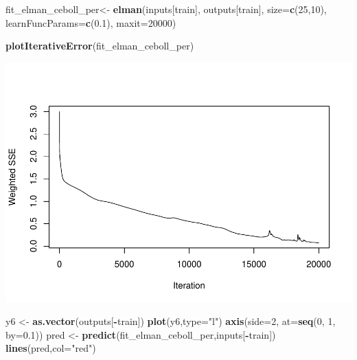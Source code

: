 \documentclass[
]{book}
\newenvironment{Shaded}{\begin{snugshade}}{\end{snugshade}}
\newcommand{\AttributeTok}[1]{\textcolor[rgb]{0.13,0.29,0.53}{#1}}
\newcommand{\DecValTok}[1]{\textcolor[rgb]{0.00,0.00,0.81}{#1}}
\newcommand{\FloatTok}[1]{\textcolor[rgb]{0.00,0.00,0.81}{#1}}
\newcommand{\FunctionTok}[1]{\textcolor[rgb]{0.13,0.29,0.53}{\textbf{#1}}}
\newcommand{\NormalTok}[1]{#1}
\newcommand{\OtherTok}[1]{\textcolor[rgb]{0.56,0.35,0.01}{#1}}
\newcommand{\SpecialCharTok}[1]{\textcolor[rgb]{0.81,0.36,0.00}{\textbf{#1}}}
\newcommand{\StringTok}[1]{\textcolor[rgb]{0.31,0.60,0.02}{#1}}
\begin{document}
\begin{Shaded}
\begin{Highlighting}[]
\NormalTok{fit\_elman\_ceboll\_per}\OtherTok{\textless{}{-}} \FunctionTok{elman}\NormalTok{(inputs[train],}
\NormalTok{                       outputs[train],}
                       \AttributeTok{size=}\FunctionTok{c}\NormalTok{(}\DecValTok{25}\NormalTok{,}\DecValTok{10}\NormalTok{),}
                       \AttributeTok{learnFuncParams=}\FunctionTok{c}\NormalTok{(}\FloatTok{0.1}\NormalTok{),}
                       \AttributeTok{maxit=}\DecValTok{20000}\NormalTok{)}


\FunctionTok{plotIterativeError}\NormalTok{(fit\_elman\_ceboll\_per)}
\end{Highlighting}
\end{Shaded}

\includegraphics{bookdown-demo_files/figure-latex/unnamed-chunk-198-1.pdf}

\begin{Shaded}
\begin{Highlighting}[]
\NormalTok{y6 }\OtherTok{\textless{}{-}} \FunctionTok{as.vector}\NormalTok{(outputs[}\SpecialCharTok{{-}}\NormalTok{train])}
\FunctionTok{plot}\NormalTok{(y6,}\AttributeTok{type=}\StringTok{"l"}\NormalTok{)}
\FunctionTok{axis}\NormalTok{(}\AttributeTok{side=}\DecValTok{2}\NormalTok{, }\AttributeTok{at=}\FunctionTok{seq}\NormalTok{(}\DecValTok{0}\NormalTok{, }\DecValTok{1}\NormalTok{, }\AttributeTok{by=}\FloatTok{0.1}\NormalTok{))}
\NormalTok{pred }\OtherTok{\textless{}{-}} \FunctionTok{predict}\NormalTok{(fit\_elman\_ceboll\_per,inputs[}\SpecialCharTok{{-}}\NormalTok{train])}
\FunctionTok{lines}\NormalTok{(pred,}\AttributeTok{col=}\StringTok{"red"}\NormalTok{)}
\end{Highlighting}
\end{Shaded}
\end{document}
